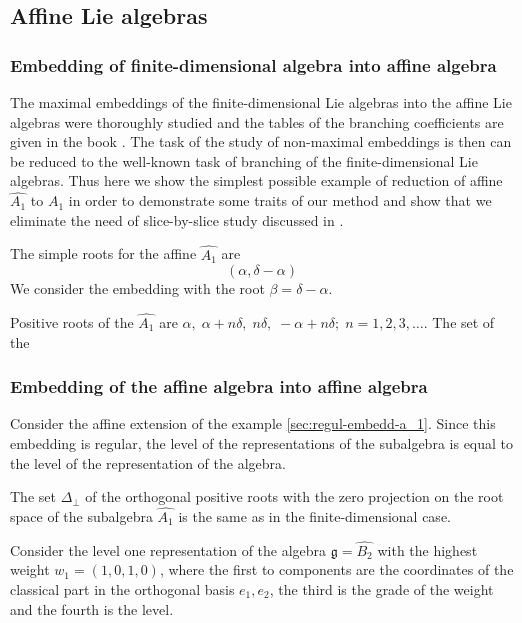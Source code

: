 \documentclass[a4paper,12pt]{article}
\theoremstyle{definition} \newtheorem{Def}{Definition}
\begin{document}
\subsection{Affine Lie algebras}
\label{sec:affine-lie-algebras}
\subsubsection{Embedding of finite-dimensional algebra into affine algebra}
\label{sec:embedd-finite-dimens}

The maximal embeddings of the finite-dimensional Lie algebras into the affine Lie algebras were thoroughly studied and the tables of the branching coefficients are given in the book \cite{kass1990ala}. The task of the study of non-maximal embeddings is then can be reduced to the well-known task of branching of the finite-dimensional Lie algebras.
Thus here we show the simplest possible example of reduction of affine $\hat{A_1}$ to $A_1$ in order to demonstrate some traits of our method and show that we eliminate the need of slice-by-slice study discussed in \cite{kass1990ala}.

The simple roots for the affine $\hat{A_1}$ are
\begin{equation}
  \label{eq:2}
  (\alpha,\delta-\alpha)
\end{equation}
We consider the embedding with the root $\beta=\delta-\alpha$. 

Positive roots of the $\hat{A_1}$ are $\alpha,\; \alpha+n\delta,\; n\delta,\; -\alpha+n\delta;\; n=1,2,3,\dots$.
The set of the 

\subsubsection{Embedding of the affine algebra into affine algebra}
\label{sec:embedd-affine-algebr}

Consider the affine extension of the example \ref{sec:regul-embedd-a_1}. 
Since this embedding is regular, the level of the representations of the subalgebra is equal to the level of the representation of the algebra. 

The set $\Delta_{\bot}$ of the orthogonal positive roots with the zero projection on the root space of the subalgebra $\hat{A_1}$ is the same as in the finite-dimensional case.

Consider the level one representation of the algebra $\mathfrak{g}=\hat{B_2}$ with the highest weight $w_1=(1,0,1,0)$, where the first to components are the coordinates of the classical part in the orthogonal basis $e_1,e_2$, the third is the grade of the weight and the fourth is the level.
\end{document}

